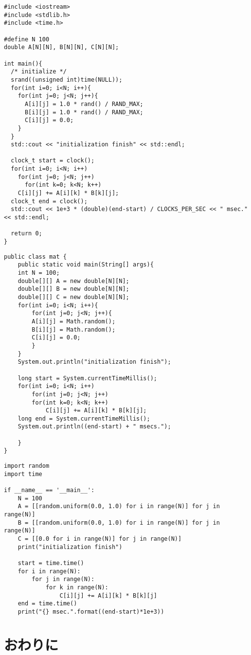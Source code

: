 \documentclass[onecolumn]{preport}
\begin{document}
\begin{lstlisting}[basicstyle=\ttfamily\footnotesize, frame=single]
#include <iostream>
#include <stdlib.h>
#include <time.h>

#define N 100
double A[N][N], B[N][N], C[N][N];

int main(){
  /* initialize */
  srand((unsigned int)time(NULL));
  for(int i=0; i<N; i++){
    for(int j=0; j<N; j++){
      A[i][j] = 1.0 * rand() / RAND_MAX;
      B[i][j] = 1.0 * rand() / RAND_MAX;
      C[i][j] = 0.0;
    }
  }
  std::cout << "initialization finish" << std::endl;

  clock_t start = clock();
  for(int i=0; i<N; i++)
    for(int j=0; j<N; j++)
      for(int k=0; k<N; k++)
	C[i][j] += A[i][k] * B[k][j];
  clock_t end = clock();
  std::cout << 1e+3 * (double)(end-start) / CLOCKS_PER_SEC << " msec." << std::endl;

  return 0;
}
\end{lstlisting}
\begin{lstlisting}[basicstyle=\ttfamily\footnotesize, frame=single]
public class mat {
    public static void main(String[] args){
	int N = 100;
	double[][] A = new double[N][N];
	double[][] B = new double[N][N];
	double[][] C = new double[N][N];
	for(int i=0; i<N; i++){
	    for(int j=0; j<N; j++){
		A[i][j] = Math.random();
		B[i][j] = Math.random();
		C[i][j] = 0.0;
	    }
	}
	System.out.println("initialization finish");

	long start = System.currentTimeMillis();
	for(int i=0; i<N; i++)
	    for(int j=0; j<N; j++)
		for(int k=0; k<N; k++)
		    C[i][j] += A[i][k] * B[k][j];
	long end = System.currentTimeMillis();
	System.out.println((end-start) + " msecs.");

    }
}
\end{lstlisting}
\begin{lstlisting}[basicstyle=\ttfamily\footnotesize, frame=single]
import random
import time

if __name__ == '__main__':
    N = 100
    A = [[random.uniform(0.0, 1.0) for i in range(N)] for j in range(N)]
    B = [[random.uniform(0.0, 1.0) for i in range(N)] for j in range(N)]
    C = [[0.0 for i in range(N)] for j in range(N)]
    print("initialization finish")

    start = time.time()
    for i in range(N):
        for j in range(N):
            for k in range(N):
                C[i][j] += A[i][k] * B[k][j]
    end = time.time()
    print("{} msec.".format((end-start)*1e+3))
\end{lstlisting}

\section{おわりに}



\end{document}
